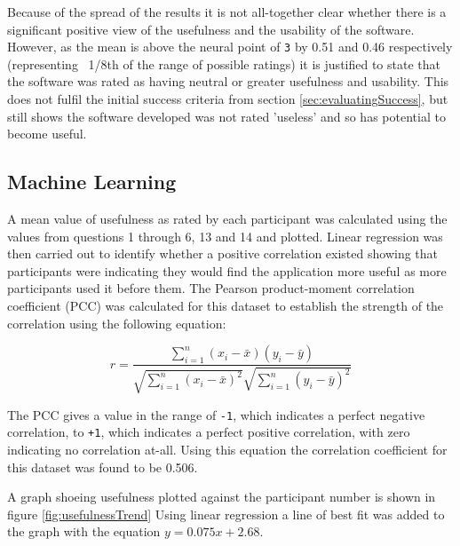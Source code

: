 \documentclass[authoryearcitations]{UoYCSproject}
\begin{document}
Because of the spread of the results it is not all-together clear whether there is a significant positive view of the usefulness and the usability of the software. However, as the mean is above the neural point of \texttt{3} by 0.51 and 0.46 respectively (representing ~1/8th of the range of possible ratings) it is justified to state that the software was rated as having neutral or greater usefulness and usability. This does not fulfil the initial success criteria from section \ref{sec:evaluatingSuccess}, but still shows the software developed was not rated 'useless' and so has potential to become useful.


\subsection{Machine Learning}
\label{subsec:resultsMachineLearning}

A mean value of usefulness as rated by each participant was calculated using the values from questions 1 through 6, 13 and 14 and plotted. Linear regression was then carried out to identify whether a positive correlation existed showing that participants were indicating they would find the application more useful as more participants used it before them. The Pearson product-moment correlation coefficient (PCC) was calculated for this dataset to establish the strength of the correlation using the following equation: 

$$r= \frac{\sum_{i=1}^{n} (x_{i}-\bar{x})(y_{i}-\bar{y})}{\sqrt{\sum_{i=1}^{n}(x_{i}-\bar{x})^{2}}\sqrt{\sum_{i=1}^{n}(y_{i}-\bar{y})^{2}}}$$

The PCC gives a value in the range of \texttt{-1}, which indicates a perfect negative correlation, to \texttt{+1}, which indicates a perfect positive correlation, with zero indicating no correlation at-all. Using this equation the correlation coefficient for this dataset was found to be 0.506.

A graph shoeing usefulness plotted against the participant number is shown in figure \ref{fig:usefulnessTrend} Using linear regression a line of best fit was added to the graph with the equation $y = 0.075 x + 2.68$.
\end{document}

